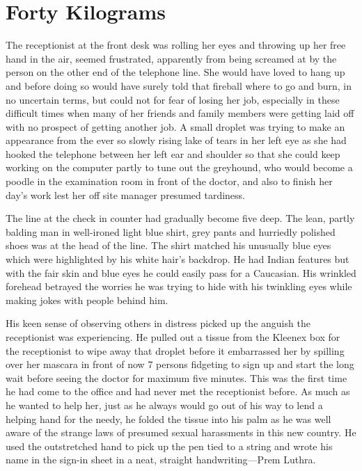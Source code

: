 \chapter{Forty Kilograms}

The receptionist at the front desk was rolling her eyes and throwing up
her free hand in the air, seemed frustrated, apparently from being
screamed at by the person on the other end of the telephone line. She
would have loved to hang up and before doing so would have surely told
that fireball where to go and burn, in no uncertain terms, but could not
for fear of losing her job, especially in these difficult times when
many of her friends and family members were getting laid off with no
prospect of getting another job. A small droplet was trying to make an
appearance from the ever so slowly rising lake of tears in her left eye
as she had hooked the telephone between her left ear and shoulder so
that she could keep working on the computer partly to tune out the
greyhound, who would become a poodle in the examination room in front of
the doctor, and also to finish her day's work lest her off site manager
presumed tardiness.

The line at the check in counter had gradually become five deep. The
lean, partly balding man in well-ironed light blue shirt, grey pants and
hurriedly polished shoes was at the head of the line. The shirt matched
his unusually blue eyes which were highlighted by his white hair's
backdrop. He had Indian features but with the fair skin and blue eyes he
could easily pass for a Caucasian. His wrinkled forehead betrayed the
worries he was trying to hide with his twinkling eyes while making jokes
with people behind him.

His keen sense of observing others in distress picked up the anguish the
receptionist was experiencing. He pulled out a tissue from the Kleenex
box for the receptionist to wipe away that droplet before it embarrassed
her by spilling over her mascara in front of now 7 persons fidgeting to
sign up and start the long wait before seeing the doctor for maximum
five minutes. This was the first time he had come to the office and had
never met the receptionist before. As much as he wanted to help her,
just as he always would go out of his way to lend a helping hand for the
needy, he folded the tissue into his palm as he was well aware of the
strange laws of presumed sexual harassments in this new country. He used
the outstretched hand to pick up the pen tied to a string and wrote his
name in the sign-in sheet in a neat, straight handwriting---Prem Luthra.

